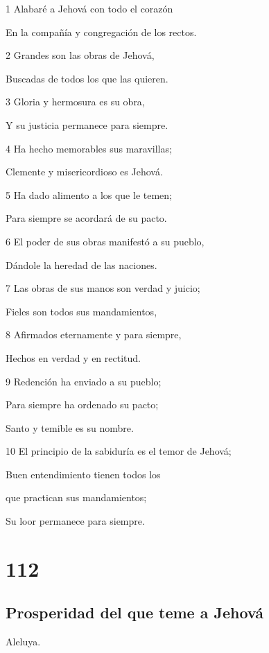 \par 1 Alabaré a Jehová con todo el corazón
\par En la compañía y congregación de los rectos.
\par 2 Grandes son las obras de Jehová,
\par Buscadas de todos los que las quieren.
\par 3 Gloria y hermosura es su obra,
\par Y su justicia permanece para siempre.
\par 4 Ha hecho memorables sus maravillas;
\par Clemente y misericordioso es Jehová.
\par 5 Ha dado alimento a los que le temen;
\par Para siempre se acordará de su pacto.
\par 6 El poder de sus obras manifestó a su pueblo,
\par Dándole la heredad de las naciones.
\par 7 Las obras de sus manos son verdad y juicio;
\par Fieles son todos sus mandamientos,
\par 8 Afirmados eternamente y para siempre,
\par Hechos en verdad y en rectitud.
\par 9 Redención ha enviado a su pueblo;
\par Para siempre ha ordenado su pacto;
\par Santo y temible es su nombre.
\par 10 El principio de la sabiduría es el temor de Jehová;
\par Buen entendimiento tienen todos los
\par que practican sus mandamientos;
\par Su loor permanece para siempre.

\chapter{112}

\section*{Prosperidad del que teme a Jehová}

\par Aleluya.

